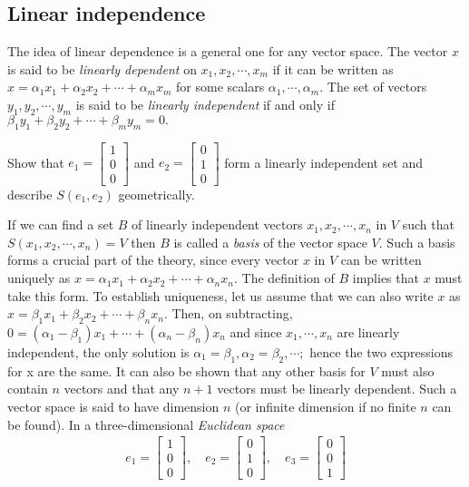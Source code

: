 \documentclass[12pt,a4paper,fleqn]{mycalc}
\begin{document}
	\subsection{Linear independence}
	The idea of linear dependence is a general one for any vector space. The vector \( x \) is said to be \emph{linearly dependent} on \( x_1, x_2, \cdots , x_m \) if it can be written as \( x = \alpha_1x_1 + \alpha_2x_2 + \cdots + \alpha_mx_m \) for some scalars \( \alpha_1,\cdots, \alpha_m. \) The set of vectors \( y_1, y_2, \cdots , y_m \) is said to be \emph{linearly independent} if and only if \( \beta_1y_1 + \beta_2y_2 + \cdots + \beta_my_m = 0. \)
	\begin{example}
		Show that \( e_1=\begin{bmatrix}
		1\\
		0\\
		0
		\end{bmatrix} \) and \( e_2=\begin{bmatrix}
		0\\
		1\\
		0
		\end{bmatrix} \) form a linearly independent set and describe \( S(e_1, e_2) \) geometrically.
	\end{example}
	If we can find a set \( B \) of linearly independent vectors \( x_1, x_2, \cdots , x_n \) in \( V \) such that \( S(x_1, x_2, \cdots , x_n) = V \) then \( B \) is called a \emph{basis} of the vector space \( V. \) Such a basis forms a crucial part of the theory, since every vector \( x \) in \( V \) can be written uniquely as \( x = \alpha_1x_1 + \alpha_2x_2 + \cdots + \alpha_nx_n. \) The definition of \( B \) implies that \( x \) must take this form. To establish uniqueness, let us assume that we can also write \( x \) as \( x = \beta_1x_1 + \beta_2x_2 + \cdots + \beta_nx_n. \) Then, on subtracting, \( 0 = (\alpha_1 - \beta_1)x_1 + \cdots + (\alpha_n - \beta_n)x_n \) and since \( x_1, \cdots , x_n \) are linearly independent, the only solution is \( \alpha_1 = \beta_1, \alpha_2 = \beta_2, \cdots ; \) hence the two expressions for x are the same. It can also be shown that any other basis for \( V \) must also contain \( n \) vectors and that any \( n + 1 \) vectors must be linearly dependent. Such a vector space is said to have
	dimension \( n \) (or infinite dimension if no finite \( n \) can be found). In a three-dimensional
	\emph{Euclidean space}
	\begin{align*}
	e_1=\begin{bmatrix}
	1\\
	0\\
	0
	\end{bmatrix},\quad
	e_2=\begin{bmatrix}
	0\\
	1\\
	0
	\end{bmatrix},\quad
	e_3=\begin{bmatrix}
	0\\
	0\\
	1
	\end{bmatrix}
	\end{align*}
\end{document}
